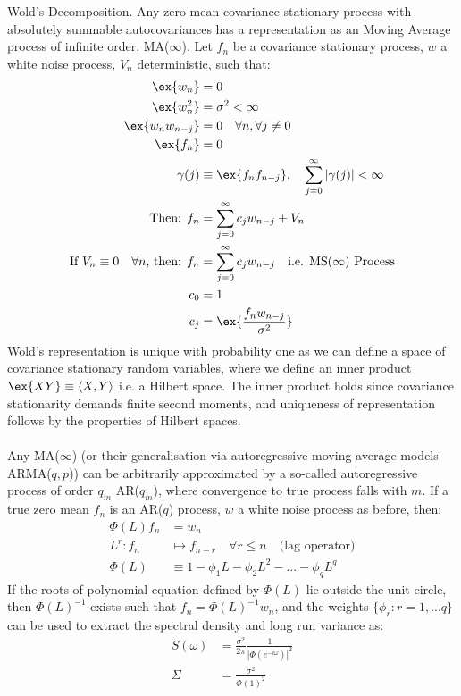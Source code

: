 \begin{defn} \label{sec:ap_ssp_ar} Wold's Decomposition. Any zero mean covariance stationary process with absolutely summable autocovariances has a representation as an Moving Average process of infinite order, MA($\infty$). Let ${f_n}$ be a covariance stationary process, $w$ a white noise process, $V_n$ deterministic, such that:
\begin{align}
\ex{w_n} & = 0 \\
\ex{w_n^2} & = \sigma^2  < \infty\\
\ex{w_nw_{n-j}} & = 0 \quad \forall n, \forall j\neq 0 \\
\ex{f_n} & = 0 \\
\gamma(j) & \equiv \ex{f_n f_{n-j}}, \quad \sum_{j=0}^{\infty} |\gamma(j)| < \infty \\
\text{Then: } f_n & = \sum_{j=0}^{\infty} c_j w_{n-j} + V_n  \\
\text{If $V_n \equiv 0 \quad \forall n$, then: } f_n & = \sum_{j=0}^{\infty} c_j w_{n-j} \quad \text{i.e. MS($\infty $) Process} \\
c_0 & = 1 \\
c_j & = \ex{\frac{f_n w_{n-j}}{\sigma^2}}
\end{align}
Wold's representation is unique with probability one as we can define a space of covariance stationary random variables, where we define an inner product $\ex{XY} \equiv \langle X,Y \rangle$ i.e. a Hilbert space. The inner product holds since covariance stationarity demands finite second moments, and uniqueness of representation follows by the properties of Hilbert spaces.
\\
\\
Any MA($\infty$) (or their generalisation via autoregressive moving average models ARMA($q, p$)) can be arbitrarily approximated by a so-called autoregressive process of order $q_m$ AR($q_m$), where convergence to true process falls with $m$. If a true zero mean ${f_n}$ is an AR($q$) process, $w$ a white noise process as before, then:
\begin{align}
\Phi(L) f_n & = w_n \\
L^r: f_n &\mapsto f_{n-r} \quad \forall r \leq n \quad \text{(lag operator)} \\
\Phi(L) & \equiv  1 - \phi_1 L - \phi_2 L^2 - ... - \phi_q L^q 
\end{align}
If the roots of polynomial equation defined by  $\Phi(L)$ lie outside the unit circle, then $\Phi(L)^{-1}$ exists such that $f_n = \Phi(L)^{-1} w_n$, and the weights $\{\phi_r: r = 1, ... q\}$ can be used to extract the spectral density and long run variance as:
\begin{align}
S(\omega) & = \frac{\sigma^2}{2 \pi }\frac{1}{|\Phi(e^{-i\omega})|^2} \label{eqn:sec:ap_ssp_ar_spectden}\\
\Sigma & = \frac{\sigma^2}{\Phi(1)^2}
\end{align}
\end{defn}


